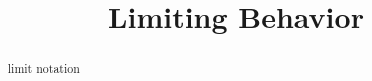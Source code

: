 \documentclass{ximera}
\title{Limiting Behavior}
\begin{document}
\begin{abstract}
limit notation
\end{abstract}
\maketitle
\end{document}
